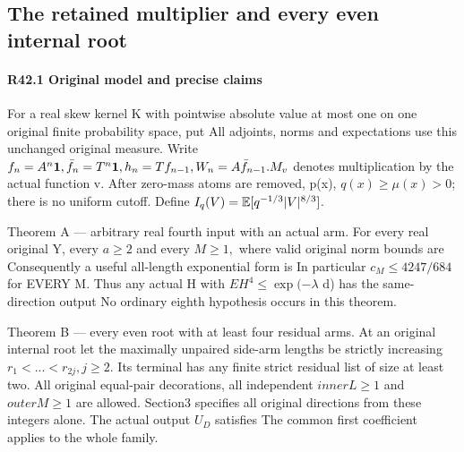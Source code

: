 \subsection{The retained multiplier and every even internal root}\label{proof:R2-C042}
\paragraph{R42.1 Original model and precise claims}

For a real skew kernel K with pointwise absolute value at most one on
one original finite probability space, put
All adjoints, norms and expectations use this unchanged original measure.
Write \(f_n=A^{n}\mathbf1,\allowbreak  \bar f_n=T^{n}\mathbf1,\allowbreak  h_n=T f_{n-1},\allowbreak  W_n=A \bar f_{n-1}. M_v\) denotes multiplication by the actual function v. After zero-mass
atoms are removed, p(x), \(q(x)\ge \mu(x)>0\); there is no uniform cutoff.
Define \(I_q(V)=\mathbb E[q^{-1/3}|V|^{8/3}]\).

Theorem A — arbitrary real fourth input with an actual arm.
For every real original Y, every \(a\ge 2\) and every \(M\ge 1,\allowbreak \)
where valid original norm bounds are
Consequently a useful all-length exponential form is
In particular \(c_M\le 4247/684\) for EVERY M. Thus any actual H with
\(EH^4\le \exp(-\lambda\) d) has the same-direction output
No ordinary eighth hypothesis occurs in this theorem.

Theorem B — every even root with at least four residual arms.
At an original internal root let the maximally unpaired side-arm lengths
be strictly increasing \(r_{1}<...<r_{2j},\allowbreak  j\ge 2.\) Its terminal has any finite
strict residual list of size at least two. All original equal-pair
decorations, all independent \(innerL\ge 1\) and \(outerM\ge 1\) are allowed.
Section3 specifies all original directions from these integers alone.
The actual output \(U_D\) satisfies
The common first coefficient applies to the whole family.


